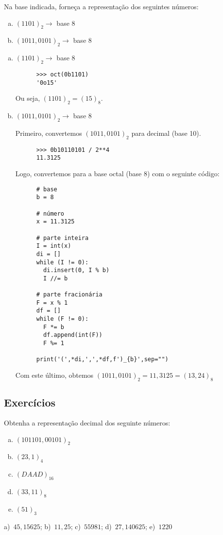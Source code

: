 \begin{exeresol}
  Na base indicada, forneça a representação dos seguintes números:
  \begin{enumerate}[a)]
  \item $(1101)_2 \to$ base 8
  \item $(1011,0101)_2 \to$ base 8
  \end{enumerate}
\end{exeresol}
\begin{resol}
  \begin{enumerate}[a)]
  \item $(1101)_2 \to$ base 8

    \begin{lstlisting}
      >>> oct(0b1101)
      '0o15'
    \end{lstlisting}
    Ou seja, $(1101)_2 = (15)_8$.
    
  \item $(1011,0101)_2 \to$ base 8

    Primeiro, convertemos $(1011,0101)_2$ para decimal (base 10).
    \begin{lstlisting}
      >>> 0b10110101 / 2**4
      11.3125    
    \end{lstlisting}
    
    Logo, convertemos para a base octal (base 8) com o seguinte código:

    \begin{lstlisting}
      # base
      b = 8

      # número
      x = 11.3125

      # parte inteira 
      I = int(x)
      di = []
      while (I != 0):
        di.insert(0, I % b)
        I //= b

      # parte fracionária
      F = x % 1
      df = []
      while (F != 0):
        F *= b
        df.append(int(F))
        F %= 1

      print('(',*di,',',*df,f')_{b}',sep="")      
    \end{lstlisting}

    Com este último, obtemos $(1011,0101)_2 = 11,3125 = (13,24)_8$
  \end{enumerate}  
\end{resol}

\subsection{Exercícios}

\begin{exer}
  Obtenha a representação decimal dos seguinte números:
  \begin{enumerate}[a)]
  \item $(101101,00101)_2$
  \item $(23,1)_4$
  \item $(DAAD)_{16}$
  \item $(33,11)_8$
  \item $(51)_3$
  \end{enumerate}
\end{exer}
\begin{resp}
  a)~$45,15625$; b)~$11,25$; c)~$55981$; d)~$27,140625$; e)~$1220$
\end{resp}

